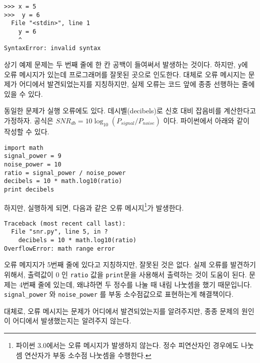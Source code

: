 
\beforeverb
\begin{verbatim}
>>> x = 5
>>>  y = 6
  File "<stdin>", line 1
    y = 6
    ^
SyntaxError: invalid syntax
\end{verbatim}
\afterverb
%
상기 예제 문제는 두 번째 줄에 한 칸 공백이 들여써서 발생하는 것이다. 
하지만, {\tt y}에 오류 메시지가 있는데 프로그래머를 잘못된 곳으로 인도한다. 
대체로 오류 메시지는 문제가 어디에서 발견되었는지를 지칭하지만, 실제 오류는 코드 앞에 종종 선행하는 줄에 있을 수 있다.


동일한 문제가 실행 오류에도 있다. 
데시벨(decibels)로 신호 대비 잡음비를 계산한다고 가정하자. 
공식은 $SNR_{db} = 10 \log_{10} (P_{signal} / P_{noise})$ 이다. 
파이썬에서 아래와 같이 작성할 수 있다.

\beforeverb
\begin{verbatim}
import math
signal_power = 9
noise_power = 10
ratio = signal_power / noise_power
decibels = 10 * math.log10(ratio)
print decibels
\end{verbatim}
\afterverb
%

하지만, 실행하게 되면, 다음과 같은 오류 메시지\footnote{파이썬 3.0에서는 오류 메시지가 발생하지 않는다.
 정수 피연산자인 경우에도 나눗셈 연산자가 부동 소수점 나눗셈을 수행한다.}가 발생한다. 


\beforeverb
\begin{verbatim}
Traceback (most recent call last):
  File "snr.py", line 5, in ?
    decibels = 10 * math.log10(ratio)
OverflowError: math range error
\end{verbatim}
\afterverb
%

오류 메지지가 5번째 줄에 있다고 지칭하지만, 잘못된 것은 없다. 
실제 오류를 발견하기 위해서, 
출력값이 0 인 {\tt ratio} 값을 {\tt print}문을 사용해서 출력하는 것이 도움이 된다.
문제는 4번째 줄에 있는데, 왜냐하면 두 정수를 나눌 때 내림 나눗셈을 했기 때문입니다. 
\verb"signal_power" 와 \verb"noise_power" 를 부동 소수점값으로 표현하는게 해결책이다.


대체로, 오류 메시지는 문제가 어디에서 발견되었는지를 알려주지만, 
종종 문제의 원인이 어디에서 발생했는지는 알려주지 않는다.

